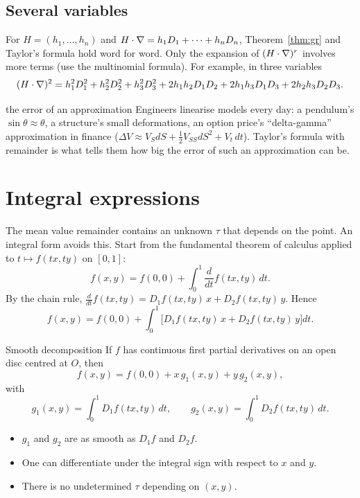 \subsection{Several variables}

For $H=(h_1,\dots,h_n)$ and $H\cdot\nabla=h_1D_1+\dots+h_nD_n$, Theorem~\ref{thm:gr} and
Taylor's formula hold word for word. Only the expansion of $(H\cdot\nabla)^r$ involves more
terms (use the multinomial formula). For example, in three variables
\[ (H\cdot\nabla)^2=h_1^2D_1^2+h_2^2D_2^2+h_3^2D_3^2+2h_1h_2D_1D_2+2h_1h_3D_1D_3+2h_2h_3D_2D_3 . \]

\begin{reallife}{the error of an approximation}
Engineers linearise models every day: a pendulum's $\sin\theta\approx\theta$, a structure's
small deformations, an option price's ``delta-gamma'' approximation in finance
($\Delta V\approx V_SdS+\tfrac12V_{SS}dS^2+V_t\,dt$). Taylor's formula with remainder is what
tells them how big the error of such an approximation can be.
\end{reallife}

\section{Integral expressions}

The mean value remainder contains an unknown $\tau$ that depends on the point. An integral
form avoids this. Start from the fundamental theorem of calculus applied to
$t\mapsto f(tx,ty)$ on $[0,1]$:
\[ f(x,y)=f(0,0)+\int_0^1\frac{d}{dt}f(tx,ty)\,dt . \]
By the chain rule, $\frac{d}{dt}f(tx,ty)=D_1f(tx,ty)\,x+D_2f(tx,ty)\,y$. Hence
\[ f(x,y)=f(0,0)+\int_0^1\big[D_1f(tx,ty)\,x+D_2f(tx,ty)\,y\big]dt . \]

\begin{proposition}{Smooth decomposition}
If $f$ has continuous first partial derivatives on an open disc centred at $O$, then
\[ f(x,y)=f(0,0)+x\,g_1(x,y)+y\,g_2(x,y), \]
with
\[ g_1(x,y)=\int_0^1D_1f(tx,ty)\,dt,\qquad g_2(x,y)=\int_0^1D_2f(tx,ty)\,dt . \]
\end{proposition}

\begin{itemize}
  \item $g_1$ and $g_2$ are as smooth as $D_1f$ and $D_2f$.
  \item One can differentiate under the integral sign with respect to $x$ and $y$.
  \item There is no undetermined $\tau$ depending on $(x,y)$.
\end{itemize}

